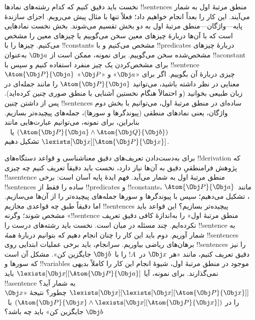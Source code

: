 \documentclass[../../../include/open-logic-section]{subfiles}
\begin{document}


نخست باید دقیق کنیم که کدام رشته‌های نمادها !!{sentence}s منطق مرتبهٔ
اول به شمار می‌آیند. این کار را بعداً انجام خواهیم داد؛ فعلاً تنها با
مثال پیش می‌رویم. اجزای سازندهٔ پایه---واژگان---منطق مرتبهٔ اول به دو
بخش تقسیم می‌شوند. بخش نخست نمادهایی است که با آن‌ها دربارهٔ چیزهای
معین سخن می‌گوییم یا چیزهای معین را مشخص می‌کنیم. چیزها را با
!!{constant}s مشخص می‌کنیم و با !!{predicate}s دربارهٔ چیزهای
مشخص‌شده سخن می‌گوییم. برای نمونه، ممکن است از $\Obj a$ به‌عنوان
!!a{constant} برای مشخص‌کردن یک چیز منفرد استفاده کنیم و سپس با
!!{sentence}~$\Atom{\Obj P}{\Obj a}$ چیزی دربارهٔ آن بگوییم. اگر برای
«$\Obj a$» و «$\Obj P$» معنایی در نظر داشته باشید، می‌توانید
$\Atom{\Obj P}{\Obj a}$ را مانند جمله‌ای در زبان طبیعی بخوانید (و
احتمالاً هنگام نخستین آشنایی با منطق صوری چنین کرده‌اید). پس از داشتن
چنین !!{sentence}s ساده‌ای در منطق مرتبهٔ اول، می‌توانیم با بخش دوم
واژگان، یعنی نمادهای منطقی (پیوندگرها و سورها)، جمله‌های پیچیده‌تر بسازیم.
بنابراین، برای نمونه، می‌توانیم عبارت‌هایی مانند
$(\Atom{\Obj P}{\Obj a} \land \Atom{\Obj Q}{\Obj b})$ یا
~$\lexists[\Obj x][\Atom{\Obj P}{\Obj x}]$ تشکیل دهیم.

برای به‌دست‌دادن تعریف‌های دقیق معناشناسی و قواعد دستگاه‌های
!!{derivation} که پژوهش فرامنطقیِ دقیق به آن‌ها نیاز دارد، نخست باید
دقیقاً تعریف کنیم چه چیزی !!a{sentence} منطق مرتبهٔ اول به شمار می‌آید.
فهم ایدهٔ پایه آسان است: برخی !!{sentence}s ساده را فقط از
!!{predicate}s و !!{constant}s، مانند~$\Atom{\Obj P}{\Obj a}$، تشکیل
می‌دهیم؛ سپس با پیوندگرها و سورها جمله‌های پیچیده‌تر را از آن‌ها
می‌سازیم. اما دقیقاً طبق چه قواعدی مجازیم !!{sentence}s پیچیده‌تر بسازیم؟
این قواعد باید مشخص شوند؛ وگرنه «!!{sentence} منطق مرتبهٔ اول» را
به‌اندازهٔ کافی دقیق تعریف نکرده‌ایم. چند مسئله در میان است. نخست باید
رشته‌های درست را !!{sentence} به شمار آوریم. دوم باید این کار را چنان
انجام دهیم که بتوانیم دربارهٔ \emph{همهٔ} !!{sentence}s برهان‌های ریاضی
بیاوریم. سرانجام، باید برخی عملیات ابتدایی روی !!{sentence}s را نیز
دقیق تعریف کنیم، مانند «هر $\Obj x$ در~$!A$ را با~$\Obj b$ جایگزین کن».
مشکل آن است که سورها و !!{variable}s موجود در منطق مرتبهٔ اول، شیوهٔ
انجام این کار را کاملاً بدیهی نمی‌گذارند. برای نمونه، آیا
$\lexists[\Obj x][\Atom{\Obj P}{\Obj a}]$ باید !!a{sentence} به شمار
آید؟ $\lexists[\Obj x][\lexists[\Obj x][\Atom{\Obj P}{\Obj x}]]$ چطور؟
نتیجهٔ «$\Obj x$ را در $(\Atom{\Obj P}{\Obj x} \land \lexists[\Obj
x][\Atom{\Obj P}{\Obj x}])$ با~$\Obj b$ جایگزین کن» باید چه باشد؟
\end{document}
